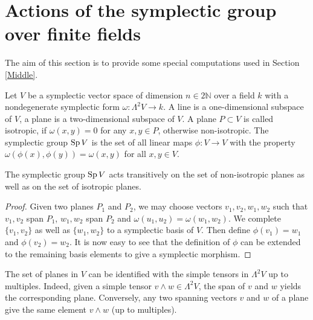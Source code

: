 \section{Actions of the symplectic group over finite fields}\label{Section_Symplectic}
The aim of this section is to provide some special computations used in Section \ref{Middle}.

Let $V$ be a symplectic vector space of dimension $n\in 2\mathbb{N}$ over a field $k$ with a nondegenerate symplectic form $\omega : \Lambda^2 V \rightarrow k$. A line is a one-dimensional subspace of $V$, a plane is a two-dimensional subspace of $V$. A plane $P\subset V$ is called isotropic, if $\omega (x,y)=0$ for any $x,y\in P$, otherwise non-isotropic.  The symplectic group $\operatorname{Sp} V$ is the set of all linear maps $\phi : V\rightarrow V$ with the property $\omega(\phi(x),\phi(y)) = \omega(x,y)$ for all $ x,y\in V$.
\begin{proposition}\label{transitively}
The symplectic group $\operatorname{Sp} V$ acts transitively on the set of non-isotropic planes as well as on the set of isotropic planes.
\end{proposition}
\begin{proof}
Given two planes $P_1$ and $P_2$, we may choose vectors $v_1,v_2,w_1,w_2$ such that $v_1,v_2$ span $P_1$, $w_1,w_2$ span $P_2$ and $\omega(u_1,u_2) =\omega(w_1,w_2)$. We complete $\{v_1,v_2\}$ as well as $\{w_1,w_2\}$ to a symplectic basis of $V$.
Then define $\phi(v_1)=w_1$ and $\phi(v_2)=w_2$. 
It is now easy to see that the definition of $\phi$ can be extended to the remaining basis elements to give a symplectic morphism.
\end{proof}
\begin{remark}
The set of planes in $V$ can be identified with the simple tensors in $\Lambda^2V$ up to multiples. Indeed, given a simple tensor $v\wedge w \in \Lambda^2 V$, the span of $v$ and $w$ yields the corresponding plane. Conversely, any two spanning vectors $v$ and $w$ of a plane give the same element $v\wedge w$ (up to multiples).
\end{remark}
